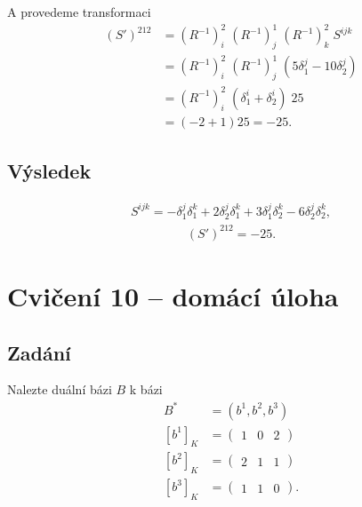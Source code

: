 \documentclass[]{article}
\begin{document}
\medskip
\medskip

A provedeme transformaci
\begin{align*}
    (S')^{212} &= (R^{-1})_i^2 \; (R^{-1})_j^1 \; (R^{-1})_k^2 \; S^{ijk} \\
        &= (R^{-1})_i^2 \; (R^{-1})_j^1 \; (5\delta^j_1 - 10\delta^j_2) \\
        &= (R^{-1})_i^2 \; (\delta^i_1 + \delta^i_2) \; 25 \\
        &= (-2 + 1) 25 = -25.
\end{align*}


\subsection{Výsledek}
\begin{align*}
    S^{ijk}
    = -\delta_1^j \delta_1^k + 2 \delta_2^j \delta_1^k
    + 3 \delta_1^j \delta_2^k - 6 \delta_2^j \delta_2^k,
\end{align*}
\begin{align*}
    (S')^{212} = -25.
\end{align*}




\section{Cvičení 10 – domácí úloha}
\subsection{Zadání}
Nalezte duální bázi $B$ k bázi
\begin{align*}
    B^* &= ( b^1,  b^2, b^3 ) \\[-.8em]
    [b^1]_K &= \begin{pmatrix}
        1 & 0 & 2
    \end{pmatrix} \\[-.8em]
    [b^2]_K &= \begin{pmatrix}
        2 & 1 & 1
    \end{pmatrix} \\[-.8em]
    [b^3]_K &= \begin{pmatrix}
        1 & 1 & 0
    \end{pmatrix}.
\end{align*}
\end{document}
